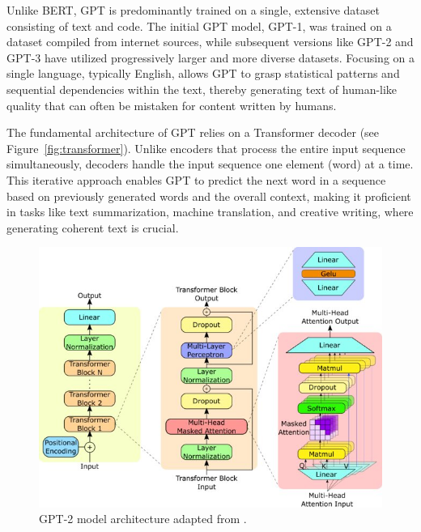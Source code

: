 Unlike BERT, GPT is predominantly trained on a single, extensive dataset consisting of text and code. 
The initial GPT model, GPT-1, was trained on a dataset compiled from internet sources, while subsequent versions like GPT-2 and GPT-3 have utilized progressively larger and more diverse datasets. 
Focusing on a single language, typically English, allows GPT to grasp statistical patterns and sequential dependencies within the text, thereby generating text of human-like quality that can often be mistaken for content written by humans.

The fundamental architecture of GPT relies on a Transformer decoder (see Figure~\ref{fig:transformer}). 
Unlike encoders that process the entire input sequence simultaneously, decoders handle the input sequence one element (word) at a time. 
This iterative approach enables GPT to predict the next word in a sequence based on previously generated words and the overall context, making it proficient in tasks like text summarization, machine translation, and creative writing, where generating coherent text is crucial.
\begin{figure}
	\centering
	\includegraphics[width=0.7\linewidth]{Figures/GPT2}
	\caption[]{GPT-2 model architecture adapted from \cite{yang23}. }
	\label{fig:gpt2}
\end{figure}

